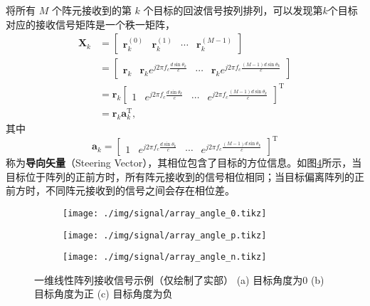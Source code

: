 将所有 \(M\) 个阵元接收到的第 \(k\) 个目标的回波信号按列排列，可以发现第\( k \)个目标对应的接收信号矩阵是一个秩一矩阵，
\[
    \begin{aligned}
        \mathbf{X}_k
         & = \begin{bmatrix}
                 \bm{r}_k^{(0)} & \bm{r}_k^{(1)} & \cdots & \bm{r}_k^{(M-1)}
             \end{bmatrix}                                                           \\
         & = \begin{bmatrix}
                 \bm{r}_k & \bm{r}_k e^{j 2 \pi f_c \frac{d \sin\theta_k}{c}} & \cdots & \bm{r}_k e^{j 2 \pi f_c \frac{(M-1) d \sin\theta_k}{c}}
             \end{bmatrix} \\
         & = \bm{r}_k
        \begin{bmatrix}
            1 & e^{j 2 \pi f_c \frac{d \sin\theta_k}{c}} & \cdots & e^{j 2 \pi f_c \frac{(M-1) d \sin\theta_k}{c}}
        \end{bmatrix}^{\mathrm{T}}                               \\
         & = \bm{r}_k \bm{a}_k^{\mathrm{T}},
    \end{aligned}
\]
其中
\[
    \bm{a}_k =
    \begin{bmatrix}
        1 & e^{j 2 \pi f_c \frac{d \sin\theta_k}{c}} & \cdots & e^{j 2 \pi f_c \frac{(M-1) d \sin\theta_k}{c}}
    \end{bmatrix}^{\mathrm{T}}
\]
称为\textbf{导向矢量}（Steering Vector），其相位包含了目标的方位信息。如图\ref{fig_array_angle}所示，当目标位于阵列的正前方时，所有阵元接收到的信号相位相同；当目标偏离阵列的正前方时，不同阵元接收到的信号之间会存在相位差。

\begin{figure}[htb!]
    \centering
    \begin{subfigure}{.23\textwidth}
        \centering
        \texttt{[image: ./img/signal/array\_angle\_0.tikz]}
        \caption{}
        \label{fig_array_angle_1}
    \end{subfigure}
    \begin{subfigure}{.23\textwidth}
        \centering
        \texttt{[image: ./img/signal/array\_angle\_p.tikz]}
        \caption{}
        \label{fig_array_angle_2}
    \end{subfigure}
    \begin{subfigure}{.23\textwidth}
        \centering
        \texttt{[image: ./img/signal/array\_angle\_n.tikz]}
        \caption{}
        \label{fig_array_angle_3}
    \end{subfigure}
    \caption{一维线性阵列接收信号示例（仅绘制了实部） (a) 目标角度为0 (b) 目标角度为正 (c) 目标角度为负}
    \label{fig_array_angle}
\end{figure}

